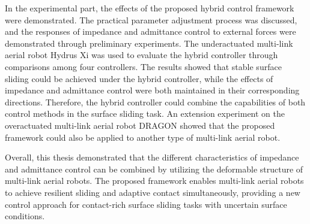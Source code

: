 In the experimental part, the effects of the proposed hybrid control framework were demonstrated. The practical parameter adjustment process was discussed, and the responses of impedance and admittance control to external forces were demonstrated through preliminary experiments. The underactuated multi-link aerial robot Hydrus Xi was used to evaluate the hybrid controller through comparisons among four controllers. The results showed that stable surface sliding could be achieved under the hybrid controller, while the effects of impedance and admittance control were both maintained in their corresponding directions. Therefore, the hybrid controller could combine the capabilities of both control methods in the surface sliding task. An extension experiment on the overactuated multi-link aerial robot DRAGON showed that the proposed framework could also be applied to another type of multi-link aerial robot.

Overall, this thesis demonstrated that the different characteristics of impedance and admittance control can be combined by utilizing the deformable structure of multi-link aerial robots. The proposed framework enables multi-link aerial robots to achieve resilient sliding and adaptive contact simultaneously, providing a new control approach for contact-rich surface sliding tasks with uncertain surface conditions.



